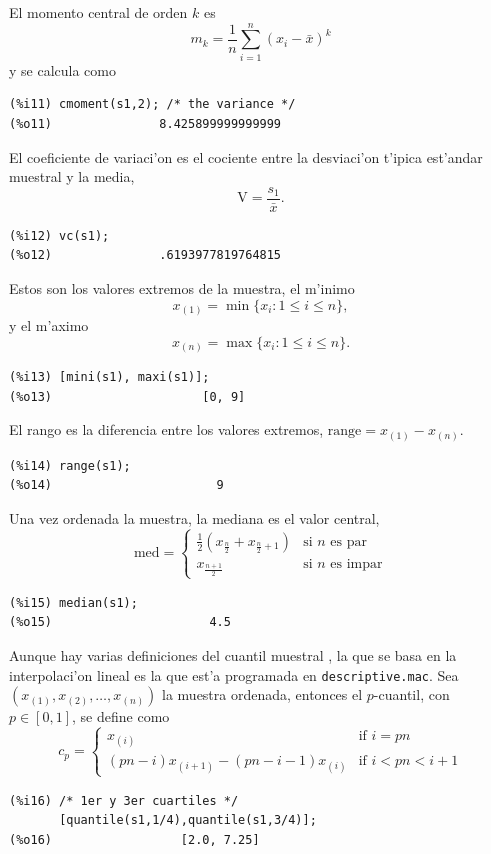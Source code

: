 \documentclass[spanish,12pt,a4paper]{article}
\begin{document}
\begin{description}
El momento central de orden $k$ es
\[
m_k=\frac{1}{n} \sum_{i=1}^n (x_i - \bar{x})^k
\]
y se calcula como
\begin{verbatim}
(%i11) cmoment(s1,2); /* the variance */
(%o11)               8.425899999999999
\end{verbatim}

\item[vc] El coeficiente de variaci'on es el cociente entre la desviaci'on t'ipica est'andar muestral y la media,
\[
\mbox{V}= \frac{s_1}{\bar{x}}.
\]
\begin{verbatim}
(%i12) vc(s1);
(%o12)               .6193977819764815
\end{verbatim}

\item[mini, maxi] Estos son los valores extremos de la muestra, el m'inimo
\[
x_{(1)}=\min\{x_i: 1 \leq i \leq n\},
\]
y el m'aximo
\[
x_{(n)}=\max\{x_i: 1 \leq i \leq n\}.
\]
\begin{verbatim}
(%i13) [mini(s1), maxi(s1)];
(%o13)                     [0, 9]
\end{verbatim}

\item[range] El rango es la diferencia entre los valores extremos, $\mbox{range}=x_{(1)}-x_{(n)}$.
\begin{verbatim}
(%i14) range(s1);
(%o14)                       9
\end{verbatim}

\item[median] Una vez ordenada la muestra, la mediana es el valor central,
\[
\mbox{med}= \left\{ \begin{array}{ll}
               \frac{1}{2} (x_{\frac{n}{2}} + x_{\frac{n}{2} + 1}) & \mbox{si $n$ es par} \\
               x_{\frac{n+1}{2}}                               & \mbox{si $n$ es impar}
            \end{array} \right.
\]
\begin{verbatim}
(%i15) median(s1);
(%o15)                      4.5
\end{verbatim}

\item[quantile] Aunque hay varias definiciones del cuantil muestral \cite{hynd}, la que se basa en la interpolaci'on lineal es la que est'a programada en \verb|descriptive.mac|. Sea $(x_{(1)}, x_{(2)}, \ldots, x_{(n)})$ la muestra ordenada, entonces el $p$-cuantil, con $p \in [0,1]$, se define como
\[
c_p= \left\{ \begin{array}{ll}
               x_{(i)} & \mbox{if $i=p n$} \\
               (p n-i)x_{(i+1)}-(p n-i-1)x_{(i)}   & \mbox{if $i < p n <i+1$}
            \end{array} \right.
\]
\begin{verbatim}
(%i16) /* 1er y 3er cuartiles */
       [quantile(s1,1/4),quantile(s1,3/4)];
(%o16)                  [2.0, 7.25]
\end{verbatim}


\end{description}
\end{document}
